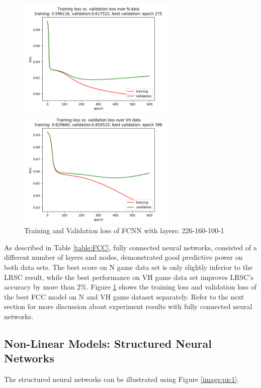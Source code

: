 \documentclass{article}
\begin{document}
\begin{figure}[htb]
\begin{minipage}[t]{0.5\linewidth}
\centering
\includegraphics[width=3.0in]{N_loss.png}
\end{minipage}%
\begin{minipage}[t]{0.5\linewidth}
\centering
\includegraphics[width=3.0in]{VH_loss.png}
\end{minipage}
\caption{Training and Validation loss of FCNN with layers: 226-160-100-1 }
\label{image:FCC}
\end{figure}

As described in Table \ref{table:FCC}, fully connected neural networks, consisted of a different number of layers and nodes, demonstrated good predictive power on both data sets. The best score on N game data set is only slightly inferior to the LRSC result, while the best performance on VH game data set improves LRSC’s accuracy by more than 2\%. Figure \ref{image:FCC} shows the training loss and validation loss of the best FCC model on N and VH game dataset separately. Refer to the next section for more discussion about experiment results with fully connected neural networks.


\subsection{Non-Linear Models: Structured Neural Networks}
The structured neural networks can be illustrated using Figure \ref{image:pic1}.
\end{document}
